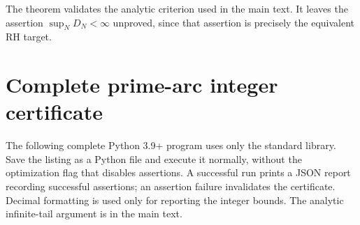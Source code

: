 \documentclass[11pt,a4paper]{article}
\theoremstyle{definition}\newtheorem{definition}[theorem]{Definition}
\theoremstyle{remark}\newtheorem{remark}[theorem]{Remark}
\numberwithin{equation}{section}
\begin{document}
The theorem validates the analytic criterion used in the main text.
It leaves the assertion $\sup_ND_N<\infty$ unproved, since that
assertion is precisely the equivalent RH target.

\clearpage
\section{Complete prime-arc integer certificate}
\label{r5:prime-code}

The following complete Python 3.9+ program uses only the standard library.
Save the listing as a Python file and execute it normally, without the
optimization flag that disables assertions. A successful run prints a
JSON report recording successful assertions; an assertion failure invalidates
the certificate. Decimal formatting is used only for reporting the
integer bounds. The analytic infinite-tail argument is in the main text.
\end{document}
